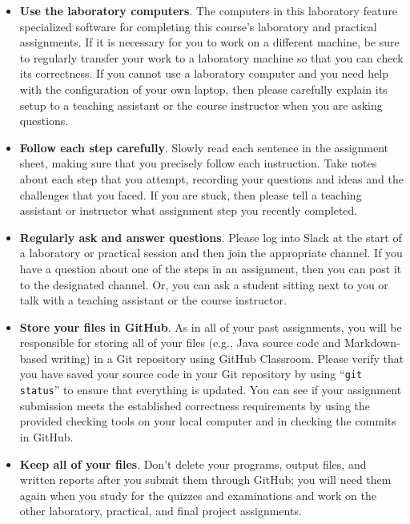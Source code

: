 \documentclass[11pt]{article}
\newcommand{\command}[1]{``\lstinline{#1}''}
\begin{document}
\begin{itemize}
  \setlength{\itemsep}{0pt}

\item {\bf Use the laboratory computers}. The computers in this laboratory feature specialized software for completing
  this course's laboratory and practical assignments. If it is necessary for you to work on a different machine, be sure
  to regularly transfer your work to a laboratory machine so that you can check its correctness. If you cannot use a
  laboratory computer and you need help with the configuration of your own laptop, then please carefully explain its
  setup to a teaching assistant or the course instructor when you are asking questions.

\item {\bf Follow each step carefully}. Slowly read each sentence in the assignment sheet, making sure that you
  precisely follow each instruction. Take notes about each step that you attempt, recording your questions and ideas and
  the challenges that you faced. If you are stuck, then please tell a teaching assistant or instructor what assignment
  step you recently completed.

\item {\bf Regularly ask and answer questions}. Please log into Slack at the start of a laboratory or practical session
  and then join the appropriate channel. If you have a question about one of the steps in an assignment, then you can
  post it to the designated channel. Or, you can ask a student sitting next to you or talk with a teaching assistant or
  the course instructor.

\item {\bf Store your files in GitHub}. As in all of your past assignments, you will be responsible for storing
  all of your files (e.g., Java source code and Markdown-based writing) in a Git repository using GitHub Classroom.
  Please verify that you have saved your source code in your Git repository by using \command{git status} to ensure that
  everything is updated. You can see if your assignment submission meets the established correctness requirements by
  using the provided checking tools on your local computer and in checking the commits in GitHub.

\item {\bf Keep all of your files}. Don't delete your programs, output files, and written reports after you submit them
  through GitHub; you will need them again when you study for the quizzes and examinations and work on the other
  laboratory, practical, and final project assignments.


\end{itemize}
\end{document}
